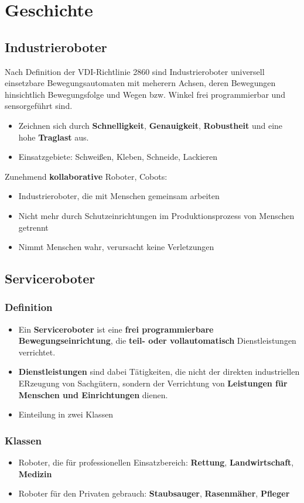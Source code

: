 \chapter{Geschichte}
\section{Industrieroboter}
Nach Definition der VDI-Richtlinie 2860 sind Industrieroboter universell einsetzbare Bewegungsautomaten mit meherern Achsen, deren Bewegungen hinsichtlich Bewegungsfolge und Wegen bzw. Winkel frei programmierbar und sensorgeführt sind.
\begin{itemize}
	\item Zeichnen sich durch \textbf{Schnelligkeit}, \textbf{Genauigkeit}, \textbf{Robustheit }und eine hohe \textbf{Traglast }aus.
	\item Einsatzgebiete: Schweißen, Kleben, Schneide, Lackieren
\end{itemize}
Zunehmend \textbf{kollaborative} Roboter, Cobots:
\begin{itemize}
	\item Industrieroboter, die mit Menschen gemeinsam arbeiten
	\item Nicht mehr durch Schutzeinrichtungen im Produktionsprozess von Menschen getrennt
	\item Nimmt Menschen wahr, verursacht keine Verletzungen
\end{itemize}

\section{Serviceroboter}
\subsection{Definition}
\begin{itemize}
	\item Ein \textbf{Serviceroboter} ist eine \textbf{frei programmierbare Bewegungseinrichtung}, die \textbf{teil- oder vollautomatisch} Dienstleistungen verrichtet.
	\item \textbf{Dienstleistungen} sind dabei Tätigkeiten, die nicht der direkten industriellen ERzeugung von Sachgütern, sondern der Verrichtung von \textbf{Leistungen für Menschen und Einrichtungen} dienen.
	\item Einteilung in zwei Klassen

\end{itemize}
\subsection{Klassen}
\begin{itemize}
	\item Roboter, die für professionellen Einsatzbereich: \textbf{Rettung}, \textbf{Landwirtschaft}, \textbf{Medizin}
	\item Roboter für den Privaten gebrauch: \textbf{Staubsauger}, \textbf{Rasenmäher}, \textbf{Pfleger}
\end{itemize}
